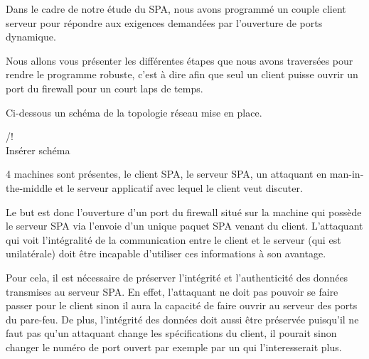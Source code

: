Dans le cadre de notre étude du SPA, nous avons programmé un couple client serveur pour répondre aux exigences demandées par l'ouverture de ports dynamique.

Nous allons vous présenter les différentes étapes que nous avons traversées pour rendre le programme robuste, c'est à dire afin que seul un client puisse ouvrir un port du firewall pour un court laps de temps.

Ci-dessous un schéma de la topologie réseau mise en place.

/!\\ Insérer schéma

4 machines sont présentes, le client SPA, le serveur SPA, un attaquant en man-in-the-middle et le serveur applicatif avec lequel le client veut discuter.

Le but est donc l'ouverture d'un port du firewall situé sur la machine qui possède le serveur SPA via l'envoie d'un unique paquet SPA venant du client. L'attaquant qui voit l'intégralité de la communication entre le client et le serveur (qui est unilatérale) doit être incapable d'utiliser ces informations à son avantage.

Pour cela, il est nécessaire de préserver l'intégrité et l'authenticité des données transmises au serveur SPA. En effet, l'attaquant ne doit pas pouvoir se faire passer pour le client sinon il aura la capacité de faire ouvrir au serveur des ports du pare-feu.
De plus, l'intégrité des données doit aussi être préservée puisqu'il ne faut pas qu'un attaquant change les spécifications du client, il pourait sinon changer le numéro de port ouvert par exemple par un qui l'interesserait plus.
 

